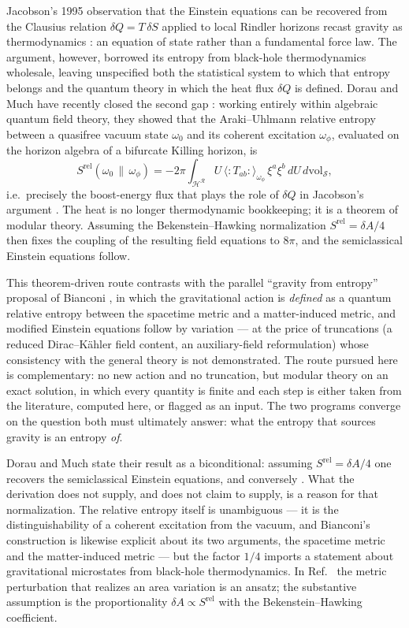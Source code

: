\documentclass[11pt]{article}
\newcommand{\Srel}{S^{\mathrm{rel}}}
\begin{document}
Jacobson's 1995 observation that the Einstein equations can be recovered from the Clausius relation $\delta Q = T\,\delta S$ applied to local Rindler horizons recast gravity as thermodynamics \cite{Jacobson}: an equation of state rather than a fundamental force law. The argument, however, borrowed its entropy from black-hole thermodynamics wholesale, leaving unspecified both the statistical system to which that entropy belongs and the quantum theory in which the heat flux $\delta Q$ is defined. Dorau and Much have recently closed the second gap \cite{DorauMuch}: working entirely within algebraic quantum field theory, they showed that the Araki--Uhlmann relative entropy between a quasifree vacuum state $\omega_0$ and its coherent excitation $\omega_\phi$, evaluated on the horizon algebra of a bifurcate Killing horizon, is
\begin{equation}
\Srel(\omega_0 \,\|\, \omega_\phi)
= -2\pi \int_{\mathcal{H}^{\mathcal{R}}} U \,\langle{:}T_{ab}{:}\rangle_{\omega_\phi}\, \xi^a \xi^b \, dU\, d\mathrm{vol}_{\mathcal{S}},
\label{eq:DM-pivot}
\end{equation}
i.e.\ precisely the boost-energy flux that plays the role of $\delta Q$ in Jacobson's argument \cite{Jacobson}. The heat is no longer thermodynamic bookkeeping; it is a theorem of modular theory. Assuming the Bekenstein--Hawking normalization $\Srel = \delta A/4$ then fixes the coupling of the resulting field equations to $8\pi$, and the semiclassical Einstein equations follow.

This theorem-driven route contrasts with the parallel ``gravity from entropy'' proposal of Bianconi \cite{Bianconi2025,Bianconi2026}, in which the gravitational action is \emph{defined} as a quantum relative entropy between the spacetime metric and a matter-induced metric, and modified Einstein equations follow by variation --- at the price of truncations (a reduced Dirac--K\"ahler field content, an auxiliary-field reformulation) whose consistency with the general theory is not demonstrated. The route pursued here is complementary: no new action and no truncation, but modular theory on an exact solution, in which every quantity is finite and each step is either taken from the literature, computed here, or flagged as an input. The two programs converge on the question both must ultimately answer: what the entropy that sources gravity is an entropy \emph{of}.

Dorau and Much state their result as a biconditional: assuming $\Srel = \delta A/4$ one recovers the semiclassical Einstein equations, and conversely \cite{DorauMuch}. What the derivation does not supply, and does not claim to supply, is a reason for that normalization. The relative entropy itself is unambiguous --- it is the distinguishability of a coherent excitation from the vacuum, and Bianconi's construction is likewise explicit about its two arguments, the spacetime metric and the matter-induced metric \cite{Bianconi2025} --- but the factor $1/4$ imports a statement about gravitational microstates from black-hole thermodynamics. In Ref.~\cite{DorauMuch} the metric perturbation that realizes an area variation is an ansatz; the substantive assumption is the proportionality $\delta A\propto\Srel$ with the Bekenstein--Hawking coefficient.
\end{document}
